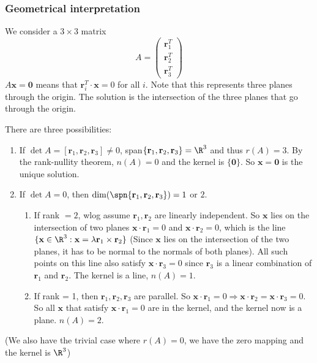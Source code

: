 \documentclass[a4paper]{article}
\begin{document}
\subsubsection{Geometrical interpretation}
We consider a $3\times 3$ matrix
\[
  A = \begin{pmatrix} \mathbf{r}_1^T\\\mathbf{r}_2^T\\\mathbf{r}_3^T\end{pmatrix}
\]
$A\mathbf{x} = \mathbf{0}$ means that $\mathbf{r}_i^T\cdot \mathbf{x} = 0$ for all $i$. Note that this represents three planes through the origin. The solution is the intersection of the three planes that go through the origin.

There are three possibilities:
\begin{enumerate}
  \item If $\det A =[\mathbf{r}_1, \mathbf{r}_2, \mathbf{r}_3] \not= 0$, span$\{\mathbf{r}_1, \mathbf{r}_2, \mathbf{r}_3\} = \R^3$ and thus $r(A) = 3$. By the rank-nullity theorem, $n(A) = 0$ and the kernel is $\{\mathbf{0}\}$. So $\mathbf{x} = \mathbf{0}$ is the unique solution.
  \item If $\det A = 0$, then  $\dim(\spn\{\mathbf{r}_1, \mathbf{r}_2, \mathbf{r}_3\}) = 1$ or $2$.
    \begin{enumerate}
      \item If rank $= 2$, wlog assume $\mathbf{r}_1, \mathbf{r}_2$ are linearly independent. So $\mathbf{x}$ lies on the intersection of two planes $\mathbf{x}\cdot \mathbf{r}_1 = 0$ and $\mathbf{x}\cdot \mathbf{r}_2 = 0$, which is the line $\{\mathbf{x}\in \R^3: \mathbf{x} = \lambda \mathbf{r}_1\times \mathbf{r}_2\}$ (Since $\mathbf{x}$ lies on the intersection of the two planes, it has to be normal to the normals of both planes). All such points on this line also satisfy $\mathbf{x}\cdot\mathbf{r}_3 = 0$ since $\mathbf{r}_3$ is a linear combination of $\mathbf{r}_1$ and $\mathbf{r}_2$. The kernel is a line, $n(A) = 1$.
      \item If rank = 1, then $\mathbf{r}_1, \mathbf{r}_2, \mathbf{r}_3$ are parallel. So $\mathbf{x}\cdot \mathbf{r}_1 = 0 \Rightarrow \mathbf{x}\cdot \mathbf{r}_2 = \mathbf{x}\cdot \mathbf{r}_3 = 0$. So all $\mathbf{x}$ that satisfy $\mathbf{x}\cdot \mathbf{r}_1 = 0$ are in the kernel, and the kernel now is a plane. $n(A) = 2$.
    \end{enumerate}
\end{enumerate}
(We also have the trivial case where $r(A) = 0$, we have the zero mapping and the kernel is $\R^3$)
\end{document}
